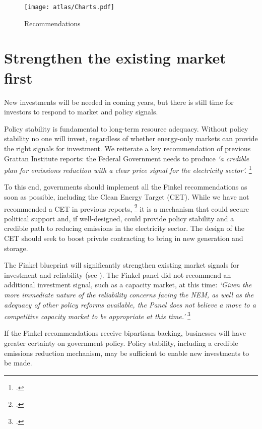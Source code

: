 \documentclass[FrontPage]{grattan}
\begin{document}
\begin{figure}
\caption{Recommendations}\label{fig:flow-chart-of-recs}
\texttt{[image: atlas/Charts.pdf]}
\end{figure}

\section{Strengthen the existing market first}\label{sec:strengthen-the-existing-market-first} 
New investments will be needed in coming years, but there is still time for investors to respond to market and policy signals. 

Policy stability is fundamental to long-term resource adequacy. Without policy stability no one will invest, regardless of whether energy-only markets can provide the right signals for investment. We reiterate a key recommendation of previous Grattan Institute reports: the Federal Government needs to produce \emph{`a credible plan for emissions reduction with a clear price signal for the electricity sector'.}
\footcites{WoodBlowers-2017-Powering-Through}{WoodBlowers-2016-Keeping-the-lights-on-SA}{WoodBlowers-2016-Climate-phoenix}

To this end, governments should implement all the Finkel recommendations as soon as possible, including the Clean Energy Target (CET). While we have not recommended a CET in previous reports,%
\footcites{WoodBlowers-2016-Climate-phoenix}
it is a mechanism that could secure political support and, if well-designed, could provide policy stability and a credible path to reducing emissions in the electricity sector. The design of the CET should seek to boost private contracting to bring in new generation and storage. 

The Finkel blueprint will significantly strengthen existing market signals for investment and reliability (see ). The Finkel panel did not recommend an additional investment signal, such as a capacity market, at this time: \emph{`Given the more immediate nature of the reliability concerns facing the NEM, as well as the adequacy of other policy reforms available, the Panel does not believe a move to a competitive capacity market to be appropriate at this time.'}
\footcite[][85]{Finkel2017ReviewFinal}

If the Finkel recommendations receive bipartisan backing, businesses will have greater certainty on government policy. Policy stability, including a credible emissions reduction mechanism, may be sufficient to enable new investments to be made.
\end{document}
